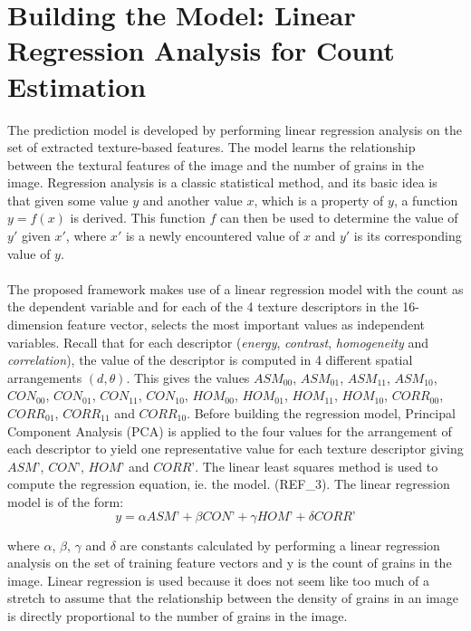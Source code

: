 \bigskip

\goodbreak
\section{Building the Model: Linear Regression Analysis for Count Estimation}
The prediction model is developed by performing linear regression analysis on the set of extracted texture-based features. The model learns the relationship between the textural features of the image and the number of grains in the image. Regression analysis is a classic statistical method, and its basic idea is that given some value $y$ and another value $x$, which is a property of $y$, a function $y = f(x)$ is derived. This function $f$ can then be used to determine the value of $y\prime$ given $x\prime$, where $x\prime$ is a newly encountered value of $x$ and $y\prime$ is its corresponding value of $y$.\\ \\
The proposed framework makes use of a linear regression model with the count as the dependent variable and for each of the 4 texture descriptors in the 16-dimension feature vector, selects the most important values as independent variables. Recall that for each descriptor (\textit{energy}, \textit{contrast}, \textit{homogeneity} and \textit{correlation}), the value of the descriptor is computed in 4 different spatial arrangements $(d,\theta)$. This gives the values $ASM_{00}$, $ASM_{01}$, $ASM_{11}$, $ASM_{10}$, $CON_{00}$, $CON_{01}$, $CON_{11}$, $CON_{10}$, $HOM_{00}$, $HOM_{01}$, $HOM_{11}$, $HOM_{10}$, $CORR_{00}$, $CORR_{01}$, $CORR_{11}$ and $CORR_{10}$. Before building the regression model, Principal Component Analysis (PCA) is applied to the four values for the arrangement of each descriptor to yield one representative value for each texture descriptor giving $ASM\text{'}$, $CON\text{'}$, $HOM\text{'}$ and $CORR\text{'}$. The linear least squares method is used to compute the regression equation, ie. the model. (REF\_3). The linear regression model is of the form:
\begin{equation}
y = \alpha ASM\text{'} + \beta CON\text{'} + \gamma HOM\text{'} +\delta CORR\text{'}
\end{equation}

where $\alpha$, $\beta$, $\gamma$ and $\delta$ are constants calculated by performing a linear regression analysis on the set of training feature vectors and y is the count of grains in the image. Linear regression is used because it does not seem like too much of a stretch to assume that the relationship between the density of grains in an image is directly proportional to the number of grains in the image.
\bigskip

